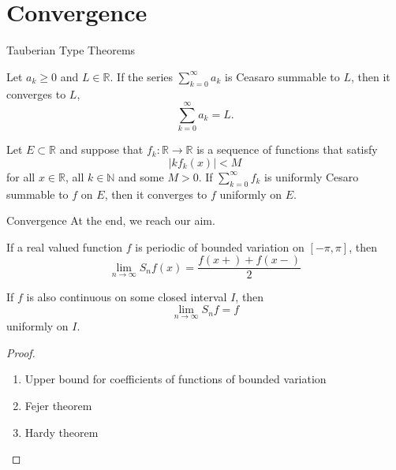 \documentclass{beamer}
\newcommand{\NN}{{\mathbb N}} %
\newcommand{\RR}{{\mathbb R}} %
\begin{document}
\section{Convergence}

\begin{frame}{Tauberian Type Theorems}
    \begin{theorem}[Tauberian]
    Let $a_k \geq 0$ and $L \in \RR$. If the series $\sum_{k=0}^{\infty} a_k$ is Ceasaro summable to $L$, then it converges to $L$,
    \[
    \sum_{k=0}^{\infty} a_k = L.
    \]
\end{theorem}


\begin{theorem}[Hardy]\label{Hardy}
    Let $E \subset \RR$ and suppose that $f_k: \RR \to \RR$ is a sequence of functions that satisfy
    \[
    |kf_k(x)| < M
    \]
    for all $x \in \RR$, all $k \in \NN$ and some $M > 0$. If $\sum_{k=0}^{\infty}f_k$ is uniformly Cesaro summable to $f$ on $E$,
    then it converges to $f$ uniformly on $E$.
\end{theorem}

\end{frame}


\begin{frame}{Convergence}
    At the end, we reach our aim.
    \begin{theorem}\label{Dirichlet - Jordan}
    If a real valued function $f$ is periodic of bounded variation on $[-\pi,\pi]$, then
    \[
    \lim_{n \to \infty}S_nf(x) = \frac{f(x+) + f(x-)}{2}
    \]

    If $f$ is also continuous on some closed interval $I$, then
    \[
    \lim_{n \to \infty}S_nf = f
    \]
    uniformly on $I$.
\end{theorem}
\begin{proof}
    \begin{enumerate}
        \item Upper bound for coefficients of functions of bounded variation
        \item Fejer theorem
        \item Hardy theorem
    \end{enumerate}
\end{proof}
\end{frame}
\end{document}
